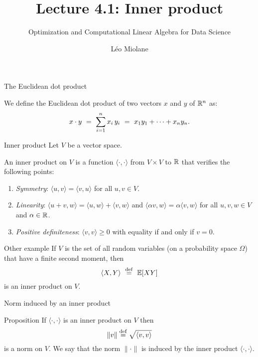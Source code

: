 \documentclass{beamer}
\title{Lecture 4.1: Inner product}
\subtitle{Optimization and Computational Linear Algebra for Data Science}
\author{Léo Miolane}
\date{}
\begin{document}
\setcounter{showProgressBar}{0}
\setcounter{showSlideNumbers}{0}

\frame{\titlepage}

\setcounter{framenumber}{0}
\setcounter{showSlideNumbers}{1}
\begin{frame}[t]{The Euclidean dot product}
	\vspace{-0.3cm}
	\begin{definition}
		We define the Euclidean dot product of two vectors $x$ and $y$ of $\mathbb{R}^n$ as:
		\vspace{-0.3cm}
		$$
		x \cdot y  \ = \ \sum_{i=1}^n x_i \, y_i \ = \ x_1 y_1 + \cdots + x_n y_n.
		\vspace{-0.3cm}
		$$
	\end{definition}
\end{frame}

\begin{frame}[t]{Inner product}
	Let $V$ be a vector space.
	\begin{definition}
		An inner product on $V$ is a function $\langle \cdot, \cdot \rangle$ from $V \times V$ to $\mathbb{R}$ that verifies the following points:
		\begin{enumerate}
			\item \emph{Symmetry}: $\langle u, v \rangle = \langle v, u\rangle$ for all $u,v \in V$.
			\item \emph{Linearity}: $\langle u+v, w \rangle = \langle u, w\rangle + \langle v, w\rangle$ and $\langle \alpha v, w \rangle = \alpha \langle v, w \rangle$ for all $u,v,w \in V$ and $\alpha \in \mathbb{R}$.
			\item \emph{Positive definiteness}: $\langle v, v\rangle \geq 0$ with equality if and only if $v = 0$.
		\end{enumerate}
	\end{definition}
\end{frame}


\begin{frame}[t]{Other example}
	If $V$ is the set of all random variables (on a probability space $\Omega$) that have a finite second moment, then 
	$$\langle X, Y \rangle \ \overset{\rm def}{=}  \ \mathbb{E}[XY]$$
	is an inner product on $V$.
\end{frame}

\begin{frame}[t]{Norm induced by an inner product}
	\vspace{-0.3cm}
	\begin{block}{Proposition}
		If $\langle \cdot, \cdot \rangle$ is an inner product on $V$ then 
		$$
		\| v \| \overset{\rm def}{=} \sqrt{\langle v, v \rangle}
		$$ 
		is a norm on $V$. We say  that the norm $\| \cdot \|$ is induced by the inner product $\langle \cdot, \cdot \rangle$.
	\end{block}
\end{frame}
\end{document}
